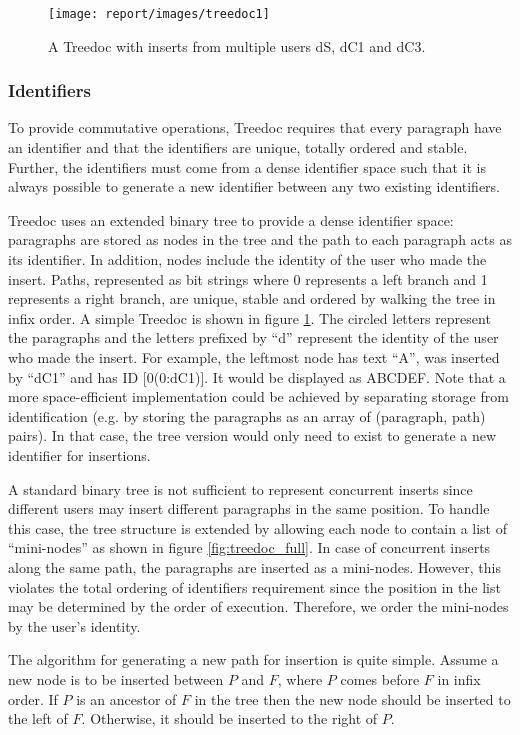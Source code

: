 \documentclass[twocolumn]{article}
\begin{document}
\begin{figure}[tbh!]
  \centering
  \texttt{[image: report/images/treedoc1]}
  \caption{A Treedoc with inserts from multiple users dS, dC1 and dC3.\label{fig:treedoc_basic}}
\end{figure}

\subsubsection{Identifiers}
To provide commutative operations, Treedoc requires that every paragraph have an identifier and that the identifiers are unique, totally ordered and stable. Further, the identifiers must come from a dense identifier space such that it is always possible to generate a new identifier between any two existing identifiers.

Treedoc uses an extended binary tree to provide a dense identifier space: paragraphs are stored as nodes in the tree and the path to each paragraph acts as its identifier. In addition, nodes include the identity of the user who made the insert. Paths, represented as bit strings where 0 represents a left branch and 1 represents a right branch, are unique, stable and ordered by walking the tree in infix order. A simple Treedoc is shown in figure \ref{fig:treedoc_basic}. The circled letters represent the paragraphs and the letters prefixed by \enquote{d} represent the identity of the user who made the insert. For example, the leftmost node has text \enquote{A}, was inserted by \enquote{dC1} and has ID [0(0:dC1)]. It would be displayed as ABCDEF. Note that a more space-efficient implementation could be achieved by separating storage from identification (e.g. by storing the paragraphs as an array of (paragraph, path) pairs). In that case, the tree version would only need to exist to generate a new identifier for insertions.

A standard binary tree is not sufficient to represent concurrent inserts since different users may insert different paragraphs in the same position. To handle this case, the tree structure is extended by allowing each node to contain a list of \enquote{mini-nodes} as shown in figure \ref{fig:treedoc_full}. In case of concurrent inserts along the same path, the paragraphs are inserted as a mini-nodes. However, this violates the total ordering of identifiers requirement since the position in the list may be determined by the order of execution. Therefore, we order the mini-nodes by the user's identity.

The algorithm for generating a new path for insertion is quite simple. Assume a new node is to be inserted between $P$ and $F$, where $P$ comes before $F$ in infix order. If $P$ is an ancestor of $F$ in the tree then the new node should be inserted to the left of $F$. Otherwise, it should be inserted to the right of $P$.
\end{document}
